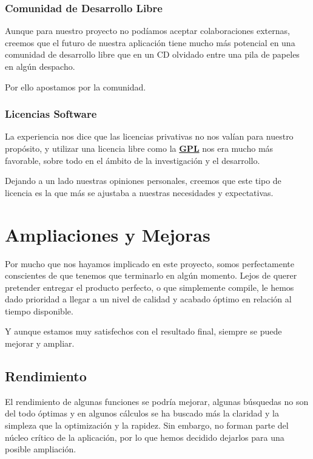 \subsubsection{Comunidad de Desarrollo Libre}

Aunque para nuestro proyecto no podíamos aceptar colaboraciones externas,
creemos que el futuro de nuestra aplicación tiene mucho más potencial en una
comunidad de desarrollo libre que en un CD olvidado entre una pila de papeles
en algún despacho.

Por ello apostamos por la comunidad.

\subsubsection{Licencias Software}

La experiencia nos dice que las licencias privativas no nos valían para
nuestro propósito, y utilizar una licencia libre como la \hyperref[ap1]{\bf GPL}
nos era mucho más favorable, sobre todo en el ámbito de la investigación y el
desarrollo.

Dejando a un lado nuestras opiniones personales, creemos que este tipo de
licencia es la que más se ajustaba a nuestras necesidades y expectativas.

\section{Ampliaciones y Mejoras}

Por mucho que nos hayamos implicado en este proyecto, somos perfectamente
conscientes de que tenemos que terminarlo en algún momento. Lejos de querer
pretender entregar el producto perfecto, o que simplemente compile, le hemos
dado prioridad a llegar a un nivel de calidad y acabado óptimo en relación al
tiempo disponible.

Y aunque estamos muy satisfechos con el resultado final, siempre se puede
mejorar y ampliar.

\subsection{Rendimiento}

El rendimiento de algunas funciones se podría mejorar, algunas búsquedas no son
del todo óptimas y en algunos cálculos se ha buscado más la claridad y la
simpleza que la optimización y la rapidez. Sin embargo, no forman parte del
núcleo crítico de la aplicación, por lo que hemos decidido dejarlos para una
posible ampliación. 

